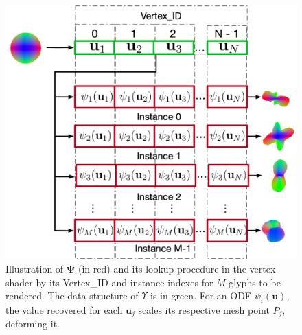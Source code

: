 \documentclass[twoside,twocolumn,10pt]{article}
\begin{document}

\begin{figure}[htb]
    \centering
    \includegraphics[width=1.0\linewidth, angle=0]{figs/rendering_scheme/GPU2Glyph.png}
    \caption{
    Illustration of $\bm{\Psi}$ (in red) and its lookup procedure in the vertex shader by its Vertex\_ID and instance indexes for $M$ glyphs to be rendered. The data structure of $\Upsilon$ is in green. For an ODF $\psi_i(\bm{u})$, the value recovered for each $\mathbf{u}_j$ scales its respective mesh point $P_j$, deforming it.
    }
    \label{fig::GPU2glyph}
\end{figure}
\end{document}
